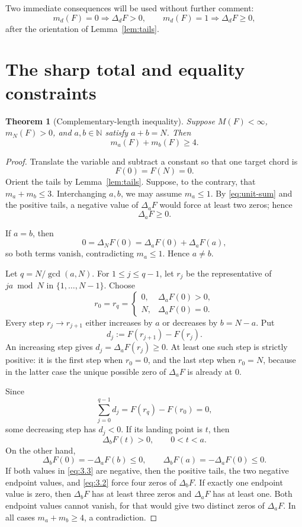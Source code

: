 \documentclass[11pt]{article}
\newtheorem{theorem}{Theorem}[section]
\theoremstyle{definition}
\theoremstyle{remark}
\newcommand{\N}{\mathbb{N}}
\begin{document}
Two immediate consequences will be used without further comment:
\[
m_d(F)=0\Longrightarrow \Delta_dF>0,
\qquad
m_d(F)=1\Longrightarrow \Delta_dF\ge0,
\tag{2.1}
\]
after the orientation of Lemma~\ref{lem:tails}.

\section{The sharp total and equality constraints}

\begin{theorem}[Complementary-length inequality]\label{thm:pair}
Suppose \(M(F)<\infty\), \(m_N(F)>0\), and \(a,b\in\N\) satisfy
\(a+b=N\).  Then
\[
m_a(F)+m_b(F)\ge4.
\]
\end{theorem}

\begin{proof}
Translate the variable and subtract a constant so that one target chord is
\[
F(0)=F(N)=0.
\]
Orient the tails by Lemma~\ref{lem:tails}.  Suppose, to the contrary, that
\(m_a+m_b\le3\).  Interchanging \(a,b\), we may assume \(m_a\le1\).
By \eqref{eq:unit-sum} and the positive tails, a negative value of
\(\Delta_aF\) would force at least two zeros; hence
\[
\Delta_aF\ge0.
\tag{3.1}
\]

If \(a=b\), then
\[
0=\Delta_NF(0)=\Delta_aF(0)+\Delta_aF(a),
\]
so both terms vanish, contradicting \(m_a\le1\).  Hence \(a\ne b\).

Let \(q=N/\gcd(a,N)\).  For \(1\le j\le q-1\), let \(r_j\) be the
representative of \(ja\bmod N\) in \(\{1,\ldots,N-1\}\).  Choose
\[
r_0=r_q=
\begin{cases}
0,&\Delta_aF(0)>0,\\
N,&\Delta_aF(0)=0.
\end{cases}
\]
Every step \(r_j\to r_{j+1}\) either increases by \(a\) or decreases by
\(b=N-a\).  Put
\[
d_j:=F(r_{j+1})-F(r_j).
\]
An increasing step gives \(d_j=\Delta_aF(r_j)\ge0\).  At least one such
step is strictly positive: it is the first step when \(r_0=0\), and the
last step when \(r_0=N\), because in the latter case the unique possible
zero of \(\Delta_aF\) is already at \(0\).

Since
\[
\sum_{j=0}^{q-1}d_j=F(r_q)-F(r_0)=0,
\]
some decreasing step has \(d_j<0\).  If its landing point is \(t\), then
\[
\Delta_bF(t)>0,
\qquad 0<t<a.
\tag{3.2}\label{eq:3.2}
\]
On the other hand,
\[
\Delta_bF(0)=-\Delta_aF(b)\le0,
\qquad
\Delta_bF(a)=-\Delta_aF(0)\le0.
\tag{3.3}\label{eq:3.3}
\]
If both values in \eqref{eq:3.3} are negative, then the positive tails,
the two negative endpoint values, and \eqref{eq:3.2} force four zeros of
\(\Delta_bF\).  If exactly one endpoint value is zero, then
\(\Delta_bF\) has at least three zeros and \(\Delta_aF\) has at least one.
Both endpoint values cannot vanish, for that would give two distinct
zeros of \(\Delta_aF\).  In all cases \(m_a+m_b\ge4\), a contradiction.
\end{proof}
\end{document}
